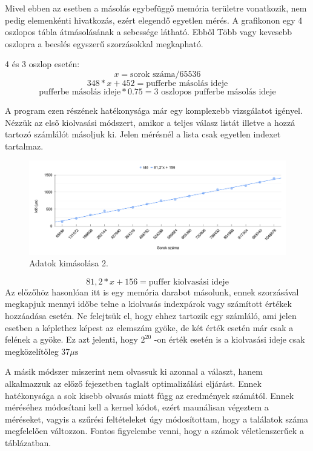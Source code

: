 Mivel ebben az esetben a másolás egybefüggő memória területre vonatkozik, nem pedig elemenkénti hivatkozás, ezért elegendő egyetlen mérés.
A grafikonon egy 4 oszlopos tábla átmásolásának a sebessége látható. Ebből Több vagy kevesebb oszlopra a becslés egyszerű szorzásokkal megkapható.

4 és 3 oszlop esetén:
$$ x = \text{sorok száma} / 65536 $$
$$ 348*x + 452 = \text{pufferbe másolás ideje} $$ 
$$ \text{pufferbe másolás ideje} * 0.75 = \text{3 oszlopos pufferbe másolás ideje}  $$




A program ezen részének hatékonysága már egy komplexebb vizsgálatot igényel.
Nézzük az első kiolvasási módszert, amikor a teljes válasz listát illetve a hozzá tartozó számlálót másoljuk ki.
Jelen mérésnél a lista csak egyetlen indexet tartalmaz. 

\begin{figure}[h!]
\centering
\includegraphics[width=\textwidth]{images/outpuffer.png}
\caption{Adatok kimásolása 2.}
\label{fig:schema}
\end{figure}

$$ 81,2*x + 156 = \text{puffer kiolvasási ideje} $$ 
Az előzőhöz hasonlóan itt is egy memória darabot másolunk, ennek szorzásával megkapjuk mennyi időbe telne a kiolvasás indexpárok vagy számított értékek hozzáadása esetén.
Ne felejtsük el, hogy ehhez tartozik egy számláló, ami jelen esetben a képlethez képest az elemszám gyöke, de két érték esetén már csak a felének a gyöke.
Ez azt jelenti, hogy $2^{20}$ -on érték esetén is a kiolvasási ideje csak megközelítőleg 37$\mu\text{s}$


A másik módszer miszerint nem olvassuk ki azonnal a választ, hanem alkalmazzuk az előző fejezetben taglalt optimalizálási eljárást.
Ennek hatékonysága a sok kisebb olvasás miatt függ az eredmények számától. Ennek méréséhez módosítani kell a kernel kódot, ezért maunálisan végeztem a méréseket, vagyis a szűrési feltételeket úgy módosítottam, hogy a találatok száma megfelelően változzon.
Fontos figyelembe venni, hogy a számok véletlenszerűek a táblázatban.

